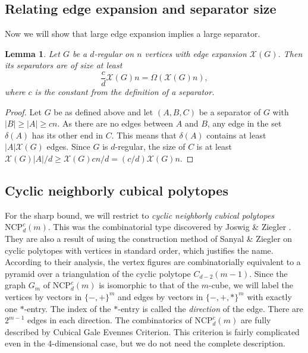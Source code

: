 \documentclass[a4paper,12pt]{book}
\theoremstyle{plain}
\newtheorem{lemma}[theorem]{Lemma}
\theoremstyle{definition}
\newcommand\NC{\textrm{NCP}}
\begin{document}
\subsection{Relating edge expansion and separator size}
Now we will show that large edge expansion implies a large separator.
\begin{lemma}
\label{separatorsize}
Let $G$ be a $d$-regular on $n$ vertices with edge expansion $\mathcal{X}(G)$.
Then its separators are of size at least
\begin{equation}
	\frac{c}{d}\mathcal{X}(G)n = \Omega(\mathcal{X}(G)n),
\end{equation}
where $c$ is the constant from the definition of a separator.
\end{lemma}
\begin{proof}
Let $G$ be as defined above and let $(A,B,C)$ be a separator of $G$ with $|B| \ge |A| \ge cn$.
As there are no edges between $A$ and $B$, any edge in the set $\delta(A)$ has its other end in
$C$. This means that $\delta(A)$ contains at least $|A|\mathcal{X}(G)$ edges. Since $G$ is $d$-regular,
the size of $C$ is at least $\mathcal{X}(G)|A|/d \ge \mathcal{X}(G)cn/d = (c/d)\mathcal{X}(G)n$.  
\end{proof}

\subsection{Cyclic neighborly cubical polytopes}

For the sharp bound, we will restrict to \textit{cyclic neighborly cubical polytopes} 
 $\NC^c_d(m)$.
This was the combinatorial type discovered by Joswig \& Ziegler \cite{Z62}. They
are also a result of using the construction method of Sanyal \& Ziegler \cite{Z102}
on cyclic polytopes with vertices in standard order, which justifies the name.  According
to their analysis, the vertex figures are combinatorially equivalent to a pyramid over
a triangulation of the cyclic polytope $C_{d-2}(m-1)$. Since the graph $G_m$ of $\NC^c_d(m)$
is isomorphic to that of the $m$-cube, we will label the vertices by vectors in $\{-,+\}^m$ and
edges by vectors in $\{-,+,*\}^m$ with exactly one $*$-entry. The index of the $*$-entry is
called the \textit{direction} of the edge. There are $2^{m-1}$ edges in each direction.
The combinatorics of $\NC^c_d(m)$ are fully described by Cubical Gale Evennes Criterion.
This criterion is fairly complicated even in the 4-dimensional case, but we do not need the 
complete description.
\end{document}
